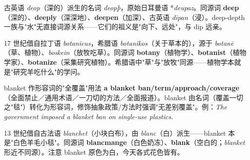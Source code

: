 \documentclass[../main.tex]{subfiles}
\begin{document}
\begin{origin}
古英语 \textit{deop}（深的）派生的名词 \textit{deopþ}，原始日耳曼语 *\textit{deupaz}。同源词 \textbf{deep}（深的）、\textbf{deeply}（深深地）、\textbf{deepen}（加深）、古英语 \textit{dīpan}（浸）。deep-depth 一族与"水"无直接词源关系——它们的祖义是"向下、远处"，与 dip 远亲。
\end{origin}



\begin{origin}
17 世纪借自拉丁语 \textit{botanicus}，希腊语 \textit{botanikos}（关于草本的），源于 \textit{botanē}（草、植物）、\textit{boskein}（放牧吃草）。同源词 \textbf{botany}（植物学）、\textbf{botanist}（植物学家）、\textbf{botanize}（采集研究植物）。希腊语中"草"与"放牧"同源——植物学本就是"研究羊吃什么"的学问。
\end{origin}




\begin{gram}{blanket 作形容词的"全覆盖"用法}
\textbf{a blanket ban/term/approach/coverage}（全面禁止／通用术语／一刀切的方法／全面报道）。blanket 由名词（覆盖一切之"毯"）转化为形容词，修饰抽象政策/方法时强调"无差别覆盖"。例：\textit{The government imposed a blanket ban on single-use plastics.}
\end{gram}

\begin{origin}
13 世纪借自古法语 \textit{blanchet}（小块白布），由 \textit{blanc}（白）派生——blanket 本是"白色羊毛小毯"。同源词 \textbf{blancmange}（白色奶冻）、\textbf{blank}（空白的；\textit{blanket} 形近不同源）。注意 blanket 原色为白，今天各式花色皆有。
\end{origin}


\end{document}
